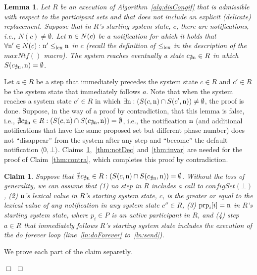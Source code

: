 \documentclass[11pt]{article}
\newcommand{\notif}{prp}
\newtheorem{lemma}[theorem]{Lemma}
\newtheorem{claim}[theorem]{Claim}
\newenvironment{proof}{\noindent{\bf Proof.}}{\hfill$\Box$}
\begin{document}
\begin{lemma}
\label{thm:convDeg}
Let $R$ be an execution of Algorithm~\ref{alg:disCongif} that is admissible with respect to the participant sets and that does not include an explicit (delicate) replacement. 
Suppose that in $R$'s starting system state, $c$, there are notifications, i.e., $N(c) \neq \emptyset$. Let $\textnormal{n} \in N(c)$ be a notification for which it holds that $\forall \textnormal{n}' \in N(c) : \textnormal{n}' \leq_{\textnormal{lex}} \textnormal{n}$ in $c$ (recall the definition of $\leq_{\textnormal{lex}}$ in the description of the $maxNtf()$ macro).
The system reaches eventually a state $c_{\nexists \textnormal{n}} \in R$ in which $S(c_{\nexists \textnormal{n}},\textnormal{n})=\emptyset$.
\end{lemma}
\begin{proof}
Let $a \in R$ be a step that immediately precedes the system state $c \in R$ and $c' \in R$ be the system state that immediately follows $a$.
Note that when the system reaches a system state $c' \in R$ in which $\exists \textnormal{n}: (S(c,\textnormal{n}) \cap S(c',\textnormal{n})) \neq \emptyset$, the proof is done.
Suppose, in the way of a proof by contradiction, that this lemma is false, i.e., $\nexists c_{\nexists \textnormal{n}} \in R:  (S(c,\textnormal{n}) \cap S(c_{\nexists \textnormal{n}},\textnormal{n})) = \emptyset$, i.e., the notification $\textnormal{n}$ (and additional  notifications that have the same proposed set but different phase number) does not ``disappear'' from the system after any step and ``become'' the default notification $\langle 0, \bot\rangle$. 
Claims~\ref{thm:general},~\ref{thm:notDec} and~\ref{thm:invar} are needed for the proof of Claim~\ref{thm:contra}, which completes this proof by contradiction.

\begin{claim}
\label{thm:general}
Suppose that $\nexists c_{\nexists \textnormal{n}} \in R:  (S(c,\textnormal{n}) \cap S(c_{\nexists \textnormal{n}},\textnormal{n})) = \emptyset$.
Without the loss of generality, we can assume that (1) no step in $R$ includes a call to $configSet(\bot)$, (2) $\textnormal{n}$'s lexical value in $R$'s starting system state, $c$, is the greater or equal to the lexical value of any notification in any system state $c'' \in  R$, (3) $\textnormal{\notif}_{i}[i] = \textnormal{n}$ in $R$'s starting system state, where $p_i \in P$ is an active participant in $R$, and (4) step $a \in R$ that immediately follows $R$'s starting system state includes the execution of the do forever loop (line~\ref{ln:doForever} to~\ref{ln:send}). 
\end{claim}
\begin{proof}
	We prove each part of the claim separetly. 
	

\end{proof}
\end{proof}
\end{document}
